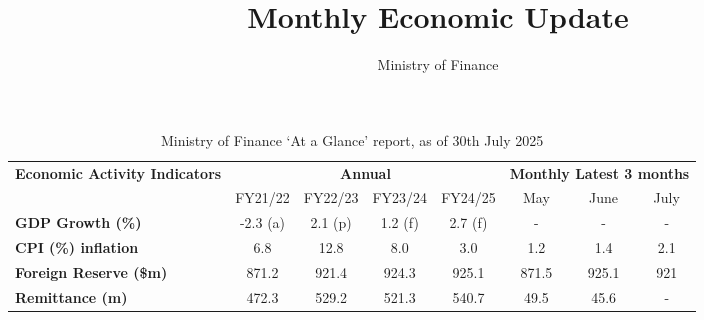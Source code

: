 \documentclass[11pt,a4paper]{setup}
\title{Monthly Economic Update}
\author{Ministry of Finance }
\begin{document}
\maketitle
\thispagestyle{firststyle} 



\begin{table*}[h] %
\centering
\caption{Ministry of Finance ‘At a Glance’ report, as of 30th July 2025}
\label{tab:economic_update}
\begin{tabular}{@{}lccccccc@{}}
\toprule
\multirow{2}{*}{\textbf{Economic Activity Indicators}} & 
\multicolumn{4}{c}{\textbf{Annual}} & 
\multicolumn{3}{c}{\textbf{Monthly Latest 3 months}} \\
\cmidrule(lr){2-5} \cmidrule(lr){6-8}
& FY21/22 & FY22/23 & FY23/24 & FY24/25 & May & June & July \\
\midrule
\textbf{\textcolor{taucolor}{GDP Growth (\%)}}  & -2.3 \textcolor{taucolor}{(a)} & 2.1 \textcolor{taucolor}{(p)} & 1.2 \textcolor{taucolor}{(f)} & 2.7 \textcolor{taucolor}{(f)} & - & - & - \\
\textbf{\textcolor{taucolor}{CPI (\%) inflation}} & 6.8 & 12.8 & 8.0 & 3.0 & 1.2 & 1.4 & 2.1 \\
\textbf{\textcolor{taucolor}{Foreign Reserve (\$m)}} & 871.2 & 921.4 & 924.3 & 925.1 & 871.5 & 925.1 & 921 \\
\textbf{\textcolor{taucolor}{Remittance (m)}} & 472.3 & 529.2 & 521.3 & 540.7 & 49.5 & 45.6 & - \\
\bottomrule

\end{tabular}
\end{table*}








\end{document}
